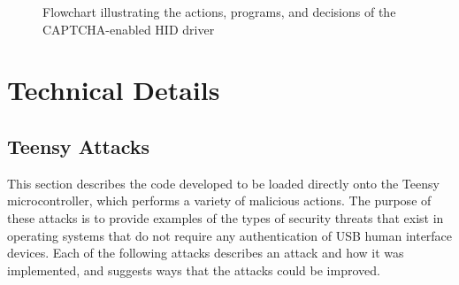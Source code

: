 \documentclass[pagenumbers]{ieee}
\begin{document}
\begin{figure}[H]
   \caption{Flowchart illustrating the actions, programs, and decisions of the CAPTCHA-enabled HID driver}
   \label{fig:flowchart}
\end{figure}



\section{Technical Details}
\label{section:technical}


\subsection{Teensy Attacks}
\label{section:teensy}

This section describes the code developed to be loaded directly onto the Teensy microcontroller, which performs a variety of malicious actions. The purpose of these attacks is to provide examples of the types of security threats that exist in operating systems that do not require any authentication of USB human interface devices. Each of the following attacks describes an attack and how it was implemented, and suggests ways that the attacks could be improved.
\end{document}
